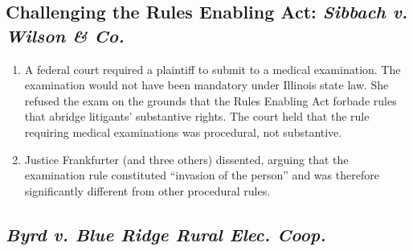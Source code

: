 \subsection{Challenging the Rules Enabling Act: \emph{Sibbach v. Wilson \& 
Co.}}

\begin{enumerate}
    \item A federal court required a plaintiff to submit to a medical 
    examination. The examination would not have been mandatory under Illinois 
    state law. She refused the exam on the grounds that the Rules Enabling Act 
    forbade rules that abridge litigants' substantive rights. The court held 
    that the rule requiring medical examinations was procedural, not 
    substantive.
    \item Justice Frankfurter (and three others) dissented, arguing that the 
    examination rule constituted ``invasion of the person'' and was therefore 
    significantly different from other procedural rules.
\end{enumerate}

\subsection{\emph{Byrd v. Blue Ridge Rural Elec. Coop.}}

